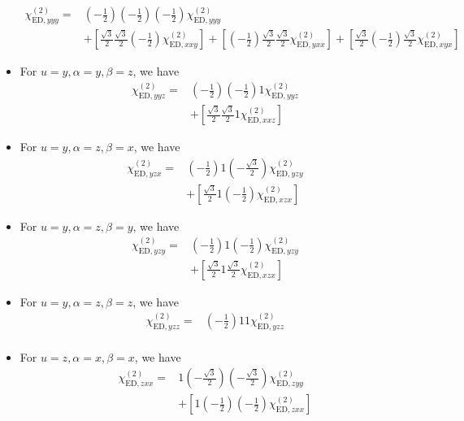\documentclass[UTF8,10pt,a4paper]{article}
\begin{document}
\begin{itemize}
\begin{align}
\nonumber\chi_{\text{ED},yyy}^{(2)}=&\left(-\frac{1}{2}\right)\left(-\frac{1}{2}\right)\left(-\frac{1}{2}\right)\chi_{\text{ED},yyy}^{(2)}\\
&+\left[\frac{\sqrt{3}}{2}\frac{\sqrt{3}}{2}\left(-\frac{1}{2}\right)\chi_{\text{ED},xxy}^{(2)}\right]+\left[\left(-\frac{1}{2}\right)\frac{\sqrt{3}}{2}\frac{\sqrt{3}}{2}\chi_{\text{ED},yxx}^{(2)}\right]+\left[\frac{\sqrt{3}}{2}\left(-\frac{1}{2}\right)\frac{\sqrt{3}}{2}\chi_{\text{ED},xyx}^{(2)}\right]
\end{align}\normalsize
\item For $u=y,\alpha=y,\beta=z$, we have
\small\begin{align}
\nonumber\chi_{\text{ED},yyz}^{(2)}=&\left(-\frac{1}{2}\right)\left(-\frac{1}{2}\right)1\chi_{\text{ED},yyz}^{(2)}\\
&+\left[\frac{\sqrt{3}}{2}\frac{\sqrt{3}}{2}1\chi_{\text{ED},xxz}^{(2)}\right]
\end{align}\normalsize
\item For $u=y,\alpha=z,\beta=x$, we have
\small\begin{align}
\nonumber\chi_{\text{ED},yzx}^{(2)}=&\left(-\frac{1}{2}\right)1\left(-\frac{\sqrt{3}}{2}\right)\chi_{\text{ED},yzy}^{(2)}\\
&+\left[\frac{\sqrt{3}}{2}1\left(-\frac{1}{2}\right)\chi_{\text{ED},xzx}^{(2)}\right]
\end{align}\normalsize
\item For $u=y,\alpha=z,\beta=y$, we have
\small\begin{align}
\nonumber\chi_{\text{ED},yzy}^{(2)}=&\left(-\frac{1}{2}\right)1\left(-\frac{1}{2}\right)\chi_{\text{ED},yzy}^{(2)}\\
&+\left[\frac{\sqrt{3}}{2}1\frac{\sqrt{3}}{2}\chi_{\text{ED},xzx}^{(2)}\right]
\end{align}\normalsize
\item For $u=y,\alpha=z,\beta=z$, we have
\small\begin{align}
\nonumber\chi_{\text{ED},yzz}^{(2)}=&\left(-\frac{1}{2}\right)11\chi_{\text{ED},yzz}^{(2)}\\
&
\end{align}\normalsize
\item For $u=z,\alpha=x,\beta=x$, we have
\small\begin{align}
\nonumber\chi_{\text{ED},zxx}^{(2)}=&1\left(-\frac{\sqrt{3}}{2}\right)\left(-\frac{\sqrt{3}}{2}\right)\chi_{\text{ED},zyy}^{(2)}\\
&+\left[1\left(-\frac{1}{2}\right)\left(-\frac{1}{2}\right)\chi_{\text{ED},zxx}^{(2)}\right]

\end{align}
\end{itemize}
\end{document}
